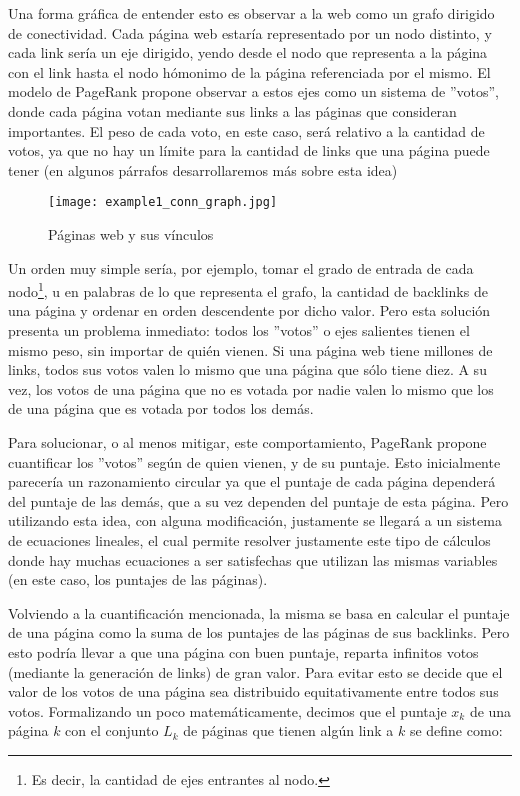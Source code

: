 \par Una forma gr\'afica de entender esto es observar a la web como un grafo
dirigido de conectividad. Cada p\'agina web estar\'ia representado por un nodo
distinto, y cada link ser\'ia un eje dirigido, yendo desde el nodo que
representa a la p\'agina con el link hasta el nodo h\'omonimo de la p\'agina
referenciada por el mismo. El modelo de PageRank propone observar a estos ejes
como un sistema de ''votos'', donde cada p\'agina votan mediante sus links a las
p\'aginas que consideran importantes. El peso de cada voto, en este caso, ser\'a
relativo a la cantidad de votos, ya que no hay un l\'imite para la cantidad de
links que una p\'agina puede tener (en algunos p\'arrafos desarrollaremos m\'as
sobre esta idea)

\begin{wrapfigure}[22]{r}{0.52\textwidth}
    \texttt{[image: example1\_conn\_graph.jpg]}
    \caption{P\'aginas web y sus v\'inculos}
\end{wrapfigure}
\noindent

\par Un orden muy simple ser\'ia, por ejemplo, tomar el grado de entrada de cada
nodo\footnote{Es decir, la cantidad de ejes entrantes al nodo.}, u en palabras
de lo que representa el grafo, la cantidad de backlinks de una p\'agina y
ordenar en orden descendente por dicho valor. Pero esta soluci\'on presenta
un problema inmediato: todos los ''votos'' o ejes salientes tienen el mismo
peso, sin importar de qui\'en vienen. Si una p\'agina web tiene millones de
links, todos sus votos valen lo mismo que una p\'agina que s\'olo tiene diez. A
su vez, los votos de una p\'agina que no es votada por nadie valen lo mismo que
los de una p\'agina que es votada por todos los dem\'as.

\par Para solucionar, o al menos mitigar, este comportamiento, PageRank propone
cuantificar los ''votos'' seg\'un de quien vienen, y de su puntaje. Esto
inicialmente parecer\'ia un razonamiento circular ya que el puntaje de cada
p\'agina depender\'a del puntaje de las dem\'as, que a su vez dependen del
puntaje de esta p\'agina. Pero utilizando esta idea, con alguna modificaci\'on,
justamente se llegar\'a a un sistema de ecuaciones lineales, el cual permite
resolver justamente este tipo de c\'alculos donde hay muchas ecuaciones a ser
satisfechas que utilizan las mismas variables (en este caso, los puntajes de las
p\'aginas).

\par Volviendo a la cuantificaci\'on mencionada, la misma se basa en calcular el
puntaje de una p\'agina como la suma de los puntajes de las p\'aginas de sus
backlinks. Pero esto podr\'ia llevar a que una p\'agina con buen puntaje,
reparta infinitos votos (mediante la generaci\'on de links) de gran valor. Para
evitar esto se decide que el valor de los votos de una p\'agina sea distribuido
equitativamente entre todos sus votos. Formalizando un poco matem\'aticamente,
decimos que el puntaje $x_k$ de una p\'agina $k$ con el conjunto $L_k$ de
p\'aginas que tienen alg\'un link a $k$ se define como:

